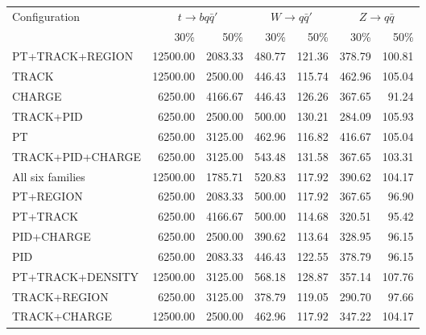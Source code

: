 \begin{table}[htbp]
\centering
\footnotesize
\setlength{\tabcolsep}{2.5pt}
\begin{tabularx}{\linewidth}{@{}Xrrrrrr@{}}
\toprule
Configuration & \multicolumn{2}{c}{$t\to bq\bar q'$} & \multicolumn{2}{c}{$W\to q\bar q'$} & \multicolumn{2}{c}{$Z\to q\bar q$} \\
\cmidrule(lr){2-3}\cmidrule(lr){4-5}\cmidrule(lr){6-7}
 & 30\% & 50\% & 30\% & 50\% & 30\% & 50\% \\
\midrule
PT+TRACK+REGION & 12500.00 & 2083.33 & 480.77 & 121.36 & 378.79 & 100.81 \\ %
TRACK & 12500.00 & 2500.00 & 446.43 & 115.74 & 462.96 & 105.04 \\ %
CHARGE & 6250.00 & 4166.67 & 446.43 & 126.26 & 367.65 & 91.24 \\ %
TRACK+PID & 6250.00 & 2500.00 & 500.00 & 130.21 & 284.09 & 105.93 \\ %
PT & 6250.00 & 3125.00 & 462.96 & 116.82 & 416.67 & 105.04 \\ %
TRACK+PID+CHARGE & 6250.00 & 3125.00 & 543.48 & 131.58 & 367.65 & 103.31 \\ %
All six families & 12500.00 & 1785.71 & 520.83 & 117.92 & 390.62 & 104.17 \\ %
PT+REGION & 6250.00 & 2083.33 & 500.00 & 117.92 & 367.65 & 96.90 \\ %
PT+TRACK & 6250.00 & 4166.67 & 500.00 & 114.68 & 320.51 & 95.42 \\ %
PID+CHARGE & 6250.00 & 2500.00 & 390.62 & 113.64 & 328.95 & 96.15 \\ %
PID & 6250.00 & 2083.33 & 446.43 & 122.55 & 378.79 & 96.15 \\ %
PT+TRACK+DENSITY & 12500.00 & 3125.00 & 568.18 & 128.87 & 357.14 & 107.76 \\ %
TRACK+REGION & 6250.00 & 3125.00 & 378.79 & 119.05 & 290.70 & 97.66 \\ %
TRACK+CHARGE & 12500.00 & 2500.00 & 462.96 & 117.92 & 347.22 & 104.17 \\ %

\end{tabularx}
\end{table}
